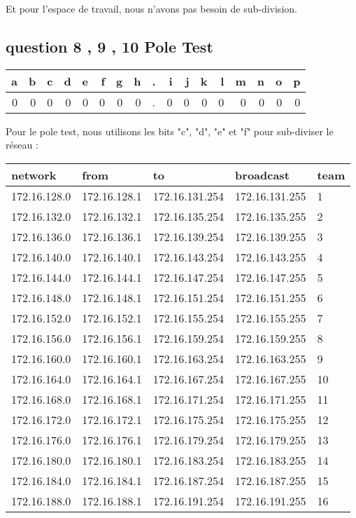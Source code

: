 \documentclass[11pt]{article}
\begin{document}
Et pour l'espace de travail, nous n'avons pas besoin de sub-division.



\subsection{question 8 , 9 , 10 Pole Test}
\label{sec:orgheadline15}


\begin{center}
\begin{tabular}{rrrrrrrrlrrrrrrrr}
a & b & c & d & e & f & g & h & . & i & j & k & l & m & n & o & p\\
\hline
0 & 0 & 0 & 0 & 0 & 0 & 0 & 0 & . & 0 & 0 & 0 & 0 & 0 & 0 & 0 & 0\\
\end{tabular}
\end{center}

Pour le pole test, nous utilisons les bits "c", "d", "e" et "f" pour sub-diviser
le réseau :


\begin{center}
\begin{tabular}{|l|l|l|l|l|}
\hline
network & from & to & broadcast & team \\
\hline
172.16.128.0 & 172.16.128.1 & 172.16.131.254 & 172.16.131.255 & 1 \\
\hline
172.16.132.0 & 172.16.132.1 & 172.16.135.254 & 172.16.135.255 & 2 \\
\hline
172.16.136.0 & 172.16.136.1 & 172.16.139.254 & 172.16.139.255 & 3 \\
\hline
172.16.140.0 & 172.16.140.1 & 172.16.143.254 & 172.16.143.255 & 4 \\
\hline
172.16.144.0 & 172.16.144.1 & 172.16.147.254 & 172.16.147.255 & 5 \\
\hline
172.16.148.0 & 172.16.148.1 & 172.16.151.254 & 172.16.151.255 & 6 \\
\hline
172.16.152.0 & 172.16.152.1 & 172.16.155.254 & 172.16.155.255 & 7 \\
\hline
172.16.156.0 & 172.16.156.1 & 172.16.159.254 & 172.16.159.255 & 8 \\
\hline
172.16.160.0 & 172.16.160.1 & 172.16.163.254 & 172.16.163.255 & 9 \\
\hline
172.16.164.0 & 172.16.164.1 & 172.16.167.254 & 172.16.167.255 & 10 \\
\hline
172.16.168.0 & 172.16.168.1 & 172.16.171.254 & 172.16.171.255 & 11 \\
\hline
172.16.172.0 & 172.16.172.1 & 172.16.175.254 & 172.16.175.255 & 12 \\
\hline
172.16.176.0 & 172.16.176.1 & 172.16.179.254 & 172.16.179.255 & 13 \\
\hline
172.16.180.0 & 172.16.180.1 & 172.16.183.254 & 172.16.183.255 & 14 \\
\hline
172.16.184.0 & 172.16.184.1 & 172.16.187.254 & 172.16.187.255 & 15 \\
\hline
172.16.188.0 & 172.16.188.1 & 172.16.191.254 & 172.16.191.255 & 16 \\
\hline
\end{tabular}
\end{center}
\end{document}
